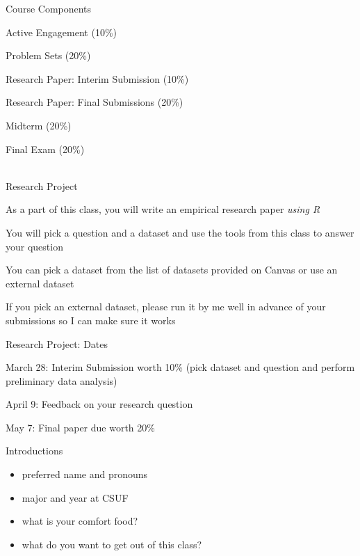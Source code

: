\documentclass{./../div_teaching_slides}
\begin{document}
\begin{frame}{Course Components}
\begin{witemize}
\item Active Engagement (10\%)
\item Problem Sets (20\%)
\item Research Paper: Interim Submission (10\%)
\item Research Paper: Final Submissions (20\%)
\item Midterm (20\%)
\item Final Exam (20\%) \\~\\
\end{witemize}
\end{frame}

\begin{frame}{Research Project}
\begin{witemize}
\item As a part of this class, you will write an empirical research paper \textit{using R} 
\item You will pick a question and a dataset and use the tools from this class to answer your question 
\item You can pick a dataset from the list of datasets provided on Canvas or use an external dataset 
\item If you pick an external dataset, please run it by me well in advance of your submissions so I can make sure it works
\end{witemize}
\end{frame}

\begin{frame}{Research Project: Dates}
\begin{witemize}
\item March 28: Interim Submission worth 10\% (pick dataset and question and perform preliminary data analysis)
\item April 9: Feedback on your research question
\item May 7: Final paper due worth 20\%
\end{witemize}
\end{frame}

\begin{frame}{Introductions}
\begin{itemize}
\item preferred name and pronouns
\item major and year at CSUF 
\item what is your comfort food?
\item what do you want to get out of this class?
\end{itemize}
\end{frame}
\end{document}
